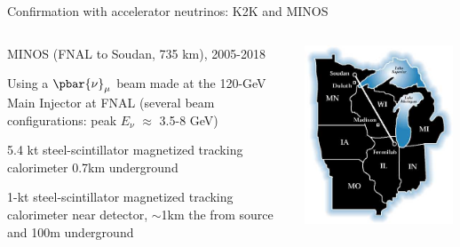 \begin{frame}[t]{Confirmation with accelerator neutrinos: K2K and MINOS}
\begin{columns}
  \begin{column}{0.45\textwidth}
    \begin{itemize}
    {\scriptsize
      \item MINOS (FNAL to Soudan, 735 km), 2005-2018\\
      \item Using a $\pbar{\nu}_{\mu}$ beam made at the 120-GeV Main Injector at FNAL (several beam configurations:
            peak $E_{\nu}$ $\approx$ 3.5-8 GeV)
      \item 5.4 kt steel-scintillator magnetized tracking calorimeter 0.7km underground
      \item 1-kt steel-scintillator magnetized tracking calorimeter near detector, $\sim$1km the from source and 100m underground\\
    }
    \end{itemize}
  \end{column}
  \begin{column}{0.25\textwidth}
    \includegraphics[width=0.99\textwidth]{./images/3nu/accelerator/minos_layout_2.jpg}
  \end{column}

\end{columns}
\end{frame}
